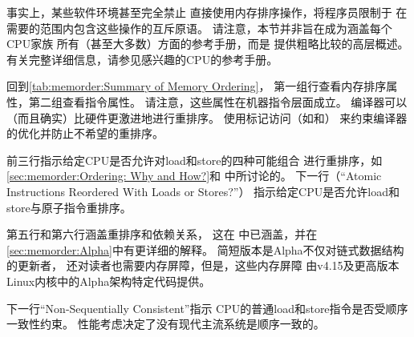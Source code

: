 \begin{table}[tb]
\vspace{5pt}\hfill
{}\OneColumnHSpace{-0.4in}
\caption{内存排序总结}
\label{tab:memorder:Summary of Memory Ordering}
\end{table}

事实上，某些软件环境甚至完全禁止
直接使用内存排序操作，将程序员限制于
在需要的范围内包含这些操作的互斥原语。
请注意，本节并非旨在成为涵盖每个CPU家族
所有（甚至大多数）方面的参考手册，而是
提供粗略比较的高层概述。
有关完整详细信息，请参见感兴趣的CPU的参考手册。

回到\cref{tab:memorder:Summary of Memory Ordering}，
第一组行查看内存排序属性，第二组查看指令属性。
请注意，这些属性在机器指令层面成立。
编译器可以（而且确实）比硬件更激进地进行重排序。
使用标记访问（如和）
来约束编译器的优化并防止不希望的重排序。

前三行指示给定CPU是否允许对load和store的四种可能组合
进行重排序，如
\cref{sec:memorder:Ordering: Why and How?}和
中所讨论的。
下一行（``Atomic Instructions Reordered With Loads or Stores?\@''）
指示给定CPU是否允许load和store与原子指令重排序。

第五行和第六行涵盖重排序和依赖关系，
这在
中已涵盖，并在\cref{sec:memorder:Alpha}中有更详细的解释。
简短版本是Alpha不仅对链式数据结构的更新者，
还对读者也需要内存屏障，但是，这些内存屏障
由v4.15及更高版本Linux内核中的Alpha架构特定代码提供。

下一行``Non-Sequentially Consistent''指示
CPU的普通load和store指令是否受顺序一致性约束。
性能考虑决定了没有现代主流系统是顺序一致的。

